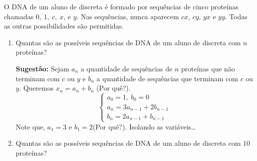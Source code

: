 \item O DNA de um aluno de discreta é formado por sequências de cinco proteínas chamadas $0,\ 1,\
  c,\ x$, e $y$. Nas sequências, nunca aparecem $cx$, $cy$, $yx$ e $yy$. Todas as outras
  possibilidades são permitidas. 
  \begin{enumerate}
	\item Quantas são as possíveis sequências de DNA de um aluno de discreta com
  $n$ proteínas?

  {\bf Sugestão:} Sejam $a_n$ a quantidade de sequências de $n$ proteínas que não terminam com $c$ ou
  $y$ e $b_n$ a quantidade de sequências que terminam com $c$ ou $y$. Queremos $x_n=a_n + b_n$ (Por quê?).
				  \[\begin{cases}
							a_0=1,\ b_0=0 \\
							a_n=3a_{n-1}+2b_{n-1}\\
							b_n= 2a_{n-1}+b_{n-1}
					\end{cases}
				  \]
				Note que, $a_1=3$ e $b_1=2$(Por quê?). Isolando as variáveis\ldots
%		
%
	\item Quantas são as possíveis sequências de DNA de um aluno de discreta com $10$ proteínas?
  \end{enumerate}
  
